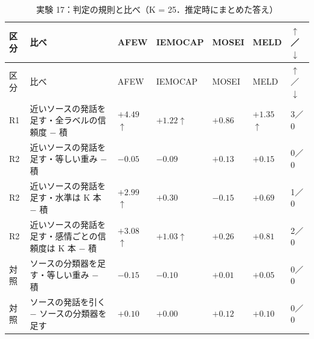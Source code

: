 \begin{longtable}{>{\raggedright}p{0.75cm}>{\raggedright}p{5.6cm}>{\raggedright}p{2.05cm}>{\raggedright}p{2.05cm}>{\raggedright}p{2.05cm}>{\raggedright}p{2.05cm}p{0.75cm}}
\caption{実験 17：判定の規則と比べ（K = 25．推定時にまとめた答え）}\\
\toprule
区分 & 比べ & AFEW & IEMOCAP & MOSEI & MELD & $\uparrow$／$\downarrow$ \\
\midrule
\endfirsthead
\toprule
区分 & 比べ & AFEW & IEMOCAP & MOSEI & MELD & $\uparrow$／$\downarrow$ \\
\midrule
\endhead
\bottomrule
\endfoot

R1 & 近いソースの発話を足す・全ラベルの信頼度 $-$ 積 & $+4.49$$\uparrow$\newline{\tiny [$+$2.6, $+$6.4]} & $+1.22$$\uparrow$\newline{\tiny [$+$0.5, $+$1.9]} & $+0.86$\newline{\tiny [$+$0.4, $+$1.3]} & $+1.35$$\uparrow$\newline{\tiny [$+$0.7, $+$2.0]} & 3／0 \\
R2 & 近いソースの発話を足す・等しい重み $-$ 積 & $-0.05$\newline{\tiny [$-$1.1, $+$1.0]} & $-0.09$\newline{\tiny [$-$0.9, $+$0.7]} & $+0.13$\newline{\tiny [$-$0.5, $+$0.7]} & $+0.15$\newline{\tiny [$-$0.5, $+$0.8]} & 0／0 \\
R2 & 近いソースの発話を足す・水準は K 本 $-$ 積 & $+2.99$$\uparrow$\newline{\tiny [$+$1.7, $+$4.3]} & $+0.30$\newline{\tiny [$-$0.1, $+$0.7]} & $-0.15$\newline{\tiny [$-$0.7, $+$0.4]} & $+0.69$\newline{\tiny [$-$0.6, $+$2.0]} & 1／0 \\
R2 & 近いソースの発話を足す・感情ごとの信頼度は K 本 $-$ 積 & $+3.08$$\uparrow$\newline{\tiny [$+$1.8, $+$4.4]} & $+1.03$$\uparrow$\newline{\tiny [$+$0.3, $+$1.7]} & $+0.26$\newline{\tiny [$-$0.5, $+$1.0]} & $+0.81$\newline{\tiny [$+$0.2, $+$1.4]} & 2／0 \\
対照 & ソースの分類器を足す・等しい重み $-$ 積 & $-0.15$ & $-0.10$ & $+0.01$ & $+0.05$ & 0／0 \\
対照 & ソースの発話を引く $-$ ソースの分類器を足す & $+0.10$ & $+0.00$ & $+0.12$ & $+0.10$ & 0／0 \\

\end{longtable}

